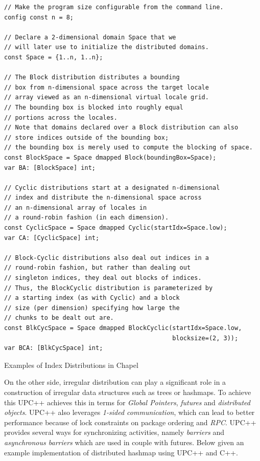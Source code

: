 \documentclass[14pt]{extreport}
\begin{document}
\begin{listing}[H]
\begin{verbatim}
// Make the program size configurable from the command line.
config const n = 8;

// Declare a 2-dimensional domain Space that we 
// will later use to initialize the distributed domains.
const Space = {1..n, 1..n};

// The Block distribution distributes a bounding 
// box from n-dimensional space across the target locale 
// array viewed as an n-dimensional virtual locale grid. 
// The bounding box is blocked into roughly equal 
// portions across the locales. 
// Note that domains declared over a Block distribution can also 
// store indices outside of the bounding box;
// the bounding box is merely used to compute the blocking of space.
const BlockSpace = Space dmapped Block(boundingBox=Space);
var BA: [BlockSpace] int;

// Cyclic distributions start at a designated n-dimensional 
// index and distribute the n-dimensional space across 
// an n-dimensional array of locales in 
// a round-robin fashion (in each dimension).
const CyclicSpace = Space dmapped Cyclic(startIdx=Space.low);
var CA: [CyclicSpace] int;

// Block-Cyclic distributions also deal out indices in a 
// round-robin fashion, but rather than dealing out 
// singleton indices, they deal out blocks of indices. 
// Thus, the BlockCyclic distribution is parameterized by 
// a starting index (as with Cyclic) and a block 
// size (per dimension) specifying how large the 
// chunks to be dealt out are.
const BlkCycSpace = Space dmapped BlockCyclic(startIdx=Space.low,
                                              blocksize=(2, 3));
var BCA: [BlkCycSpace] int;
\end{verbatim}
\caption{Examples of Index Distributions in Chapel}
\label{ChapelExamples}
\end{listing}

On the other side, irregular distribution can play a significant role in a construction of irregular data structures such as trees or hashmaps. To achieve this UPC++\cite{upcpp} achieves this in terms for \textit{Global Pointers}, \textit{futures} and \textit{distributed objects}. UPC++ also leverages \textit{1-sided communication}, which can lead to better performance because of lock constraints on package ordering and \textit{RPC}. UPC++ provides several ways for synchronizing activities, namely \textit{barriers} and \textit{asynchronous barriers} which are used in couple with futures. Below given an example implementation of distributed hashmap using UPC++ and C++.
\end{document}
